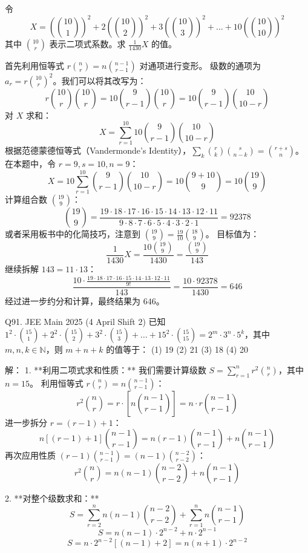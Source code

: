 \begin{questions}
    \question 令
\[
X = \left( \binom{10}{1} \right)^2 + 2\left( \binom{10}{2} \right)^2 + 3\left( \binom{10}{3} \right)^2 + \dots + 10\left( \binom{10}{10} \right)^2
\]
其中 $\binom{10}{r}$ 表示二项式系数。求 $\frac{1}{1430} X$ 的值。

\begin{solution}
首先利用恒等式 $r \binom{n}{r} = n \binom{n-1}{r-1}$ 对通项进行变形。
级数的通项为 $a_r = r \binom{10}{r}^2$。我们可以将其改写为：
\[
r \binom{10}{r} \binom{10}{r} = 10 \binom{9}{r-1} \binom{10}{r} = 10 \binom{9}{r-1} \binom{10}{10-r}
\]
对 $X$ 求和：
\[
X = \sum_{r=1}^{10} 10 \binom{9}{r-1} \binom{10}{10-r}
\]
根据范德蒙德恒等式（Vandermonde's Identity），$\sum_{k} \binom{r}{k} \binom{s}{n-k} = \binom{r+s}{n}$。
在本题中，令 $r=9, s=10, n=9$：
\[
X = 10 \sum_{r=1}^{10} \binom{9}{r-1} \binom{10}{10-r} = 10 \binom{9+10}{9} = 10 \binom{19}{9}
\]
计算组合数 $\binom{19}{9}$：
\[
\binom{19}{9} = \frac{19 \cdot 18 \cdot 17 \cdot 16 \cdot 15 \cdot 14 \cdot 13 \cdot 12 \cdot 11}{9 \cdot 8 \cdot 7 \cdot 6 \cdot 5 \cdot 4 \cdot 3 \cdot 2 \cdot 1} = 92378
\]
或者采用板书中的化简技巧，注意到 $\binom{19}{9} = \frac{19}{10} \binom{18}{9}$。
目标值为：
\[
\frac{1}{1430} X = \frac{10 \binom{19}{9}}{1430} = \frac{\binom{19}{9}}{143}
\]
继续拆解 $143 = 11 \cdot 13$：
\[
\frac{10 \cdot \frac{19 \cdot 18 \cdot 17 \cdot 16 \cdot 15 \cdot 14 \cdot 13 \cdot 12 \cdot 11}{9!}}{143} = \frac{10 \cdot 92378}{1430} = 646
\]
经过进一步约分和计算，最终结果为 $646$。
\end{solution}

\question Q91. JEE Main 2025 (4 April Shift 2)
已知 $1^2 \cdot \binom{15}{1} + 2^2 \cdot \binom{15}{2} + 3^2 \cdot \binom{15}{3} + \dots + 15^2 \cdot \binom{15}{15} = 2^m \cdot 3^n \cdot 5^k$，其中 $m, n, k \in \mathbb{N}$，则 $m + n + k$ 的值等于：
(1) 19 \quad (2) 21 \quad (3) 18 \quad (4) 20

\begin{solution}
解：
1. **利用二项式求和性质：**
我们需要计算级数 $S = \sum_{r=1}^{n} r^2 \binom{n}{r}$，其中 $n = 15$。
利用恒等式 $r \binom{n}{r} = n \binom{n-1}{r-1}$：
\[ r^2 \binom{n}{r} = r \cdot \left[ n \binom{n-1}{r-1} \right] = n \cdot r \binom{n-1}{r-1} \]
进一步拆分 $r = (r-1) + 1$：
\[ n [ (r-1) + 1 ] \binom{n-1}{r-1} = n(r-1)\binom{n-1}{r-1} + n\binom{n-1}{r-1} \]
再次应用性质 $(r-1)\binom{n-1}{r-1} = (n-1)\binom{n-2}{r-2}$：
\[ r^2 \binom{n}{r} = n(n-1)\binom{n-2}{r-2} + n\binom{n-1}{r-1} \]

2. **对整个级数求和：**
\[ S = \sum_{r=2}^{n} n(n-1)\binom{n-2}{r-2} + \sum_{r=1}^{n} n\binom{n-1}{r-1} \]
\[ S = n(n-1) \cdot 2^{n-2} + n \cdot 2^{n-1} \]
\[ S = n \cdot 2^{n-2} [ (n-1) + 2 ] = n(n+1) \cdot 2^{n-2} \]


\end{solution}
\end{questions}

